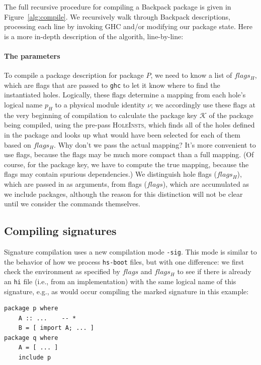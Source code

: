 \documentclass{article}
\begin{document}
The full recursive procedure for compiling a Backpack package is given
in Figure~\ref{alg:compile}.  We recursively walk through Backpack descriptions,
processing each line by invoking GHC and/or modifying our package state.
Here is a more in-depth description of the algorith, line-by-line:

\paragraph{The parameters} To compile a package description for package
$P$, we need to know a list of $flags_H$, which are flags that are
passed to \texttt{ghc} to let it know where to find the instantiated
holes.  Logically, these flags determine a mapping from each hole's
logical name $p_H$ to a physical module identity $\nu$; we accordingly
use these flags at the very beginning of compilation to calculate the
package key $\mathcal{K}$ of the package being compiled, using the
pre-pass \textsc{HoleInsts}, which finds all of the holes defined in the
package and looks up what would have been selected for each of them
based on $flags_H$.  Why don't we pass the actual mapping? It's more
convenient to use flags, because the flags may be much more compact than
a full mapping.  (Of course, for the package key, we have to compute the
true mapping, because the flags may contain spurious dependencies.)  We
distinguish hole flags ($flags_H$), which are passed in as arguments,
from flags ($flags$), which are accumulated as we include packages,
although the reason for this distinction will not be clear until we
consider the commands themselves.

\subsection{Compiling signatures}

Signature compilation uses a new compilation mode \verb|-sig|.  This
mode is similar to the behavior of how we process \verb|hs-boot| files,
but with one difference: we first check the environment as specified by
$flags$ and $flags_H$ to see if there is already an \verb|hi| file
(i.e., from an implementation) with the same logical name of this
signature, e.g.,  as would occur compiling the marked signature in this
example:

\begin{verbatim}
package p where
    A :: ...    -- *
    B = [ import A; ... ]
package q where
    A = [ ... ]
    include p
\end{verbatim}
\end{document}
